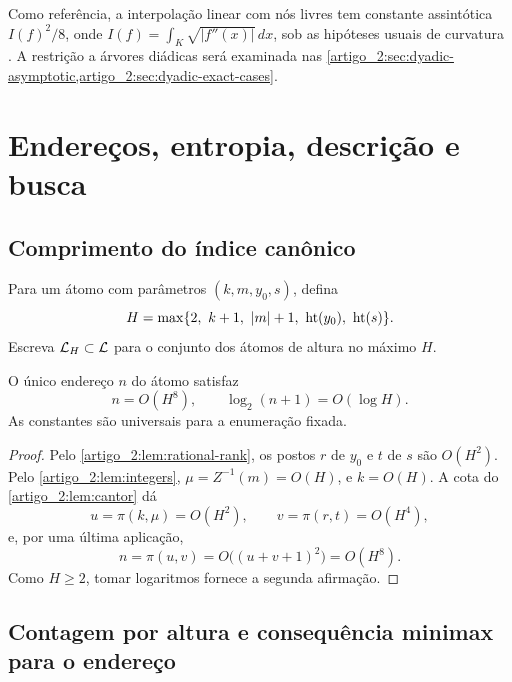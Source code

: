 Como referência, a interpolação linear com nós livres tem constante assintótica $I(f)^2/8$, onde $I(f)=\int_K\sqrt{|f''(x)|}\,dx$, sob as hipóteses usuais de curvatura \citep{artigo_1-deboor1973,artigo_1-burchard1974}. A restrição a árvores diádicas será examinada nas \cref{artigo_2:sec:dyadic-asymptotic,artigo_2:sec:dyadic-exact-cases}.

\section{Endereços, entropia, descrição e busca}
\label{artigo_2:sec:complexity}

\subsection{Comprimento do índice canônico}

Para um átomo com parâmetros $(k,m,y_0,s)$, defina
\begin{equation}
 H=\max\{2,\ k+1,\ |m|+1,\ \height(y_0),\ \height(s)\}.
 \label{artigo_2:eq:atom-height}
\end{equation}
Escreva $\mathcal{L}_H\subset\mathcal{L}$ para o conjunto dos átomos de altura no máximo $H$.

\begin{theorem}\label{map:artigo_2:3.1}\label{artigo_2:thm:index-bound}
O único endereço $n$ do átomo satisfaz
\begin{equation}
 n=O(H^8),\qquad \log_2(n+1)=O(\log H).
 \label{artigo_2:eq:index-bound}
\end{equation}
As constantes são universais para a enumeração fixada.
\end{theorem}

\begin{proof}
Pelo \cref{artigo_2:lem:rational-rank}, os postos $r$ de $y_0$ e $t$ de $s$ são $O(H^2)$. Pelo \cref{artigo_2:lem:integers}, $\mu=Z^{-1}(m)=O(H)$, e $k=O(H)$. A cota do \cref{artigo_2:lem:cantor} dá
\[
 u=\pi(k,\mu)=O(H^2),\qquad v=\pi(r,t)=O(H^4),
\]
e, por uma última aplicação,
\[
 n=\pi(u,v)=O\bigl((u+v+1)^2\bigr)=O(H^8).
\]
Como $H\ge2$, tomar logaritmos fornece a segunda afirmação.
\end{proof}

\subsection{Contagem por altura e consequência minimax para o endereço}

